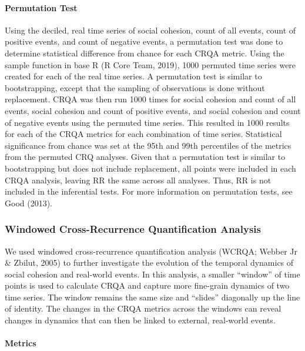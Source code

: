 \documentclass[english,man]{apa6}
\begin{document}
\hypertarget{permutation-test}{%
\paragraph{Permutation Test}\label{permutation-test}}

Using the deciled, real time series of social cohesion, count of all events, count of positive events, and count of negative events, a permutation test was done to determine statistical difference from chance for each CRQA metric. Using the sample function in base R (R Core Team, 2019), 1000 permuted time series were created for each of the real time series. A permutation test is similar to bootstrapping, except that the sampling of observations is done without replacement. CRQA was then run 1000 times for social cohesion and count of all events, social cohesion and count of positive events, and social cohesion and count of negative events using the permuted time series. This resulted in 1000 results for each of the CRQA metrics for each combination of time series. Statistical significance from chance was set at the 95th and 99th percentiles of the metrics from the permuted CRQ analyses. Given that a permutation test is similar to bootstrapping but does not include replacement, all points were included in each CRQA analysis, leaving RR the same across all analyses. Thus, RR is not included in the inferential tests. For more information on permutation tests, see Good (2013).

\hypertarget{windowed-cross-recurrence-quantification-analysis}{%
\subsubsection{Windowed Cross-Recurrence Quantification Analysis}\label{windowed-cross-recurrence-quantification-analysis}}

We used windowed cross-recurrence quantification analysis (WCRQA; Webber Jr \& Zbilut, 2005) to further investigate the evolution of the temporal dynamics of social cohesion and real-world events. In this analysis, a smaller \enquote{window} of time points is used to calculate CRQA and capture more fine-grain dynamics of two time series. The window remains the same size and \enquote{slides} diagonally up the line of identity. The changes in the CRQA metrics across the windows can reveal changes in dynamics that can then be linked to external, real-world events.

\hypertarget{metrics-1}{%
\paragraph{Metrics}\label{metrics-1}}
\end{document}
